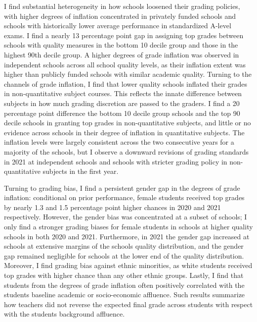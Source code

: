 I find substantial heterogeneity in how schools loosened their grading policies, with higher degrees of inflation concentrated in privately funded schools and schools with historically lower average performance in standardized A-level exams. I find a nearly 13 percentage point gap in assigning top grades between schools with quality measures in the bottom 10 decile group and those in the highest 90th decile group. A higher degrees of grade inflation was observed in independent schools across all school quality levels, as their inflation extent was higher than publicly funded schools with similar academic quality. Turning to the channels of grade inflation, I find that lower quality schools inflated their grades in non-quantitative subject courses. This reflects the innate difference between subjects in how much grading discretion are passed to the graders. I find a 20 percentage point difference the bottom 10 decile group schools and the top 90 decile schools in granting top grades in non-quantitative subjects, and little or no evidence across schools in their degree of inflation in quantitative subjects. The inflation levels were largely consistent across the two consecutive years for a majority of the schools, but I observe a downward revisions of grading standards in 2021 at independent schools and schools with stricter grading policy in non-quantitative subjects in the first year.

Turning to grading bias, I find a persistent gender gap in the degrees of grade inflation: conditional on prior performance, female students received top grades by nearly 1.3 and 1.5 percentage point higher chances in 2020 and 2021 respectively. However, the gender bias was concentrated at a subset of schools; I only find a stronger grading biases for female students in schools at higher quality schools in both 2020 and 2021. Furthermore, in 2021 the gender gap increased at schools at extensive margins of the schools quality distribution, and the gender gap remained negligible for schools at the lower end of the quality distribution. Moreover, I find grading bias against ethnic minorities, as white students received top grades with higher chance than any other ethnic groups. Lastly, I find that students from the degrees of grade inflation often positively correlated with the students baseline academic or socio-economic affluence. Such results summarize how teachers did not reverse the expected final grade across students with respect with the students background affluence.

